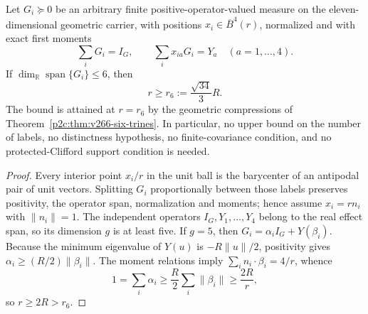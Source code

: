 \documentclass[12pt,a4paper]{article}
\begin{document}
\begin{theorem}
\label{p2c:thm:universal-geometric-rank6-radius}
Let $G_i\succeq0$ be an arbitrary finite positive-operator-valued measure
on the eleven-dimensional geometric carrier, with positions
$x_i\in\overline B^4(r)$, normalized and with exact first moments
\[
 \sum_iG_i=I_G,\qquad \sum_i x_{ia}G_i=Y_a\quad(a=1,\ldots,4).
\]
If $\dim_{\mathbb R}\operatorname{span}\{G_i\}\le6$, then
\[
 \boxed{r\ge r_6:=\frac{\sqrt{34}}3R.}
\]
The bound is attained at $r=r_6$ by the geometric compressions of
Theorem~\ref{p2c:thm:v266-six-trines}. In particular, no upper bound
on the number of labels, no distinctness hypothesis, no finite-covariance
condition, and no protected-Clifford support condition is needed.
\end{theorem}
\begin{proof}
Every interior point $x_i/r$ in the unit ball is the barycenter of
an antipodal pair of unit vectors. Splitting $G_i$ proportionally between
those labels preserves positivity, the operator span, normalization and
moments; hence assume $x_i=rn_i$ with $\|n_i\|=1$.
The independent operators $I_G,Y_1,\dots,Y_4$ belong to the real effect
span, so its dimension $g$ is at least five. If $g=5$, then
$G_i=\alpha_iI_G+Y(\beta_i)$. Because the minimum eigenvalue of
$Y(u)$ is $-R\|u\|/2$, positivity gives
$\alpha_i\ge(R/2)\|\beta_i\|$. The moment relations imply
$\sum_i n_i\cdot\beta_i=4/r$, whence
\[
 1=\sum_i\alpha_i\ge\frac R2\sum_i\|\beta_i\|
 \ge\frac{2R}{r},
\]
so $r\ge2R>r_6$.


\end{proof}
\end{document}
